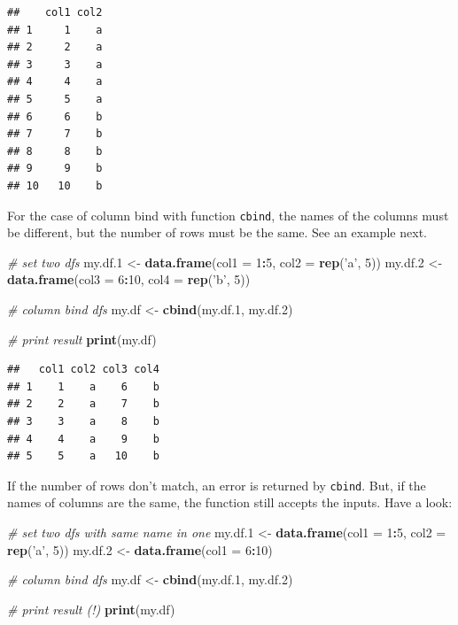 \documentclass[11pt,]{book}
\newenvironment{Shaded}{\begin{snugshade}}{\end{snugshade}}
\newcommand{\KeywordTok}[1]{\textcolor[rgb]{0.27,0.27,0.27}{\textbf{#1}}}
\newcommand{\DataTypeTok}[1]{\textcolor[rgb]{0.27,0.27,0.27}{#1}}
\newcommand{\DecValTok}[1]{\textcolor[rgb]{0.06,0.06,0.06}{#1}}
\newcommand{\StringTok}[1]{\textcolor[rgb]{0.5,0.5,0.5}{#1}}
\newcommand{\CommentTok}[1]{\textcolor[rgb]{0.56,0.35,0.01}{\textit{#1}}}
\newcommand{\OperatorTok}[1]{\textcolor[rgb]{0.81,0.36,0.00}{\textbf{#1}}}
\newcommand{\NormalTok}[1]{#1}
\begin{document}
\begin{verbatim}
##    col1 col2
## 1     1    a
## 2     2    a
## 3     3    a
## 4     4    a
## 5     5    a
## 6     6    b
## 7     7    b
## 8     8    b
## 9     9    b
## 10   10    b
\end{verbatim}

For the case of column bind with function \texttt{cbind}, the names of
the columns must be different, but the number of rows must be the same.
See an example next. 

\begin{Shaded}
\begin{Highlighting}[]
\CommentTok{# set two dfs}
\NormalTok{my.df.}\DecValTok{1}\NormalTok{ <-}\StringTok{ }\KeywordTok{data.frame}\NormalTok{(}\DataTypeTok{col1 =} \DecValTok{1}\OperatorTok{:}\DecValTok{5}\NormalTok{, }\DataTypeTok{col2 =} \KeywordTok{rep}\NormalTok{(}\StringTok{'a'}\NormalTok{, }\DecValTok{5}\NormalTok{))}
\NormalTok{my.df.}\DecValTok{2}\NormalTok{ <-}\StringTok{ }\KeywordTok{data.frame}\NormalTok{(}\DataTypeTok{col3 =} \DecValTok{6}\OperatorTok{:}\DecValTok{10}\NormalTok{, }\DataTypeTok{col4 =} \KeywordTok{rep}\NormalTok{(}\StringTok{'b'}\NormalTok{, }\DecValTok{5}\NormalTok{))}

\CommentTok{# column bind dfs}
\NormalTok{my.df <-}\StringTok{ }\KeywordTok{cbind}\NormalTok{(my.df.}\DecValTok{1}\NormalTok{, my.df.}\DecValTok{2}\NormalTok{)}

\CommentTok{# print result}
\KeywordTok{print}\NormalTok{(my.df)}
\end{Highlighting}
\end{Shaded}

\begin{verbatim}
##   col1 col2 col3 col4
## 1    1    a    6    b
## 2    2    a    7    b
## 3    3    a    8    b
## 4    4    a    9    b
## 5    5    a   10    b
\end{verbatim}

If the number of rows don't match, an error is returned by
\texttt{cbind}. But, if the names of columns are the same, the function
still accepts the inputs. Have a look:

\begin{Shaded}
\begin{Highlighting}[]
\CommentTok{# set two dfs with same name in one}
\NormalTok{my.df.}\DecValTok{1}\NormalTok{ <-}\StringTok{ }\KeywordTok{data.frame}\NormalTok{(}\DataTypeTok{col1 =} \DecValTok{1}\OperatorTok{:}\DecValTok{5}\NormalTok{, }\DataTypeTok{col2 =} \KeywordTok{rep}\NormalTok{(}\StringTok{'a'}\NormalTok{, }\DecValTok{5}\NormalTok{))}
\NormalTok{my.df.}\DecValTok{2}\NormalTok{ <-}\StringTok{ }\KeywordTok{data.frame}\NormalTok{(}\DataTypeTok{col1 =} \DecValTok{6}\OperatorTok{:}\DecValTok{10}\NormalTok{)}

\CommentTok{# column bind dfs}
\NormalTok{my.df <-}\StringTok{ }\KeywordTok{cbind}\NormalTok{(my.df.}\DecValTok{1}\NormalTok{, my.df.}\DecValTok{2}\NormalTok{)}

\CommentTok{# print result (!)}
\KeywordTok{print}\NormalTok{(my.df)}
\end{Highlighting}
\end{Shaded}
\end{document}
